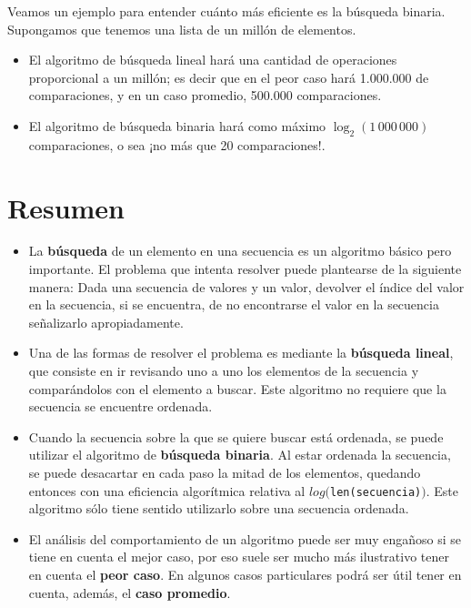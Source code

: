Veamos un ejemplo para entender cuánto más eficiente es la búsqueda binaria.
Supongamos que tenemos una lista de un millón de elementos.

\begin{itemize}
\item El algoritmo de búsqueda lineal hará una cantidad de operaciones proporcional
a un millón; es decir que en el peor caso hará 1.000.000 de comparaciones, y en
un caso promedio, 500.000 comparaciones.
\item El algoritmo de búsqueda binaria hará como máximo $\log_2(1\,000\,000)$
comparaciones, o sea ¡no más que 20 comparaciones!.
\end{itemize}

\section{Resumen}

\begin{itemize}

\item La {\bf búsqueda} de un elemento en una secuencia es un
algoritmo básico pero importante. El problema que intenta resolver puede
plantearse de la siguiente manera: Dada una secuencia de valores y un
valor, devolver el índice del valor en la secuencia, si se encuentra, de no
encontrarse el valor en la secuencia señalizarlo apropiadamente.

\item Una de las formas de resolver el problema es mediante la {\bf
búsqueda lineal}, que consiste en ir revisando uno a uno los elementos de
la secuencia y comparándolos con el elemento a buscar.  Este algoritmo no
requiere que la secuencia se encuentre ordenada.

\item Cuando la secuencia sobre la que se quiere buscar está ordenada, se
puede utilizar el algoritmo de {\bf búsqueda binaria}.  Al estar ordenada
la secuencia, se puede desacartar en cada paso la mitad de los elementos,
quedando entonces con una eficiencia algorítmica relativa al
$log($\lstinline!len(secuencia)!$)$. Este algoritmo sólo tiene sentido
utilizarlo sobre una secuencia ordenada.

\item El análisis del comportamiento de un algoritmo puede ser muy engañoso
si se tiene en cuenta el mejor caso, por eso suele ser mucho más
ilustrativo tener en cuenta el {\bf peor caso}.  En algunos casos
particulares podrá ser útil tener en cuenta, además, el {\bf caso
promedio}.
\end{itemize}



